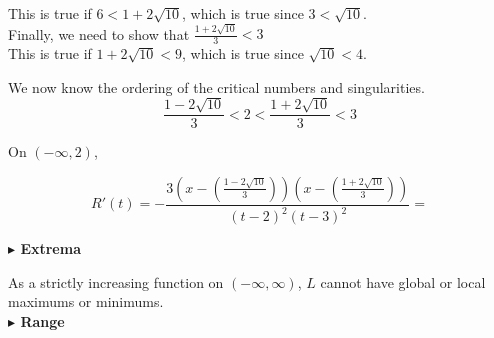 \documentclass{ximera}
\begin{document}
\begin{example}
\begin{explanation}
This is true if $6 < 1 + 2 \sqrt{10}$, which is true since $3 < \sqrt{10}$. \\



Finally, we need to show that $\frac{1 + 2 \sqrt{10}}{3} < 3$ \\


This is true if $1 + 2 \sqrt{10} < 9$, which is true since $\sqrt{10} < 4$.





\end{explanation}




We now know the ordering of the critical numbers and singularities. \\


\[
\frac{1 - 2 \sqrt{10}}{3} < 2 < \frac{1 + 2 \sqrt{10}}{3} < 3
\]





On $(-\infty, 2)$, 



\[   
R'(t) = -\frac{3 \left(x - \left(\frac{1 - 2 \sqrt{10}}{3} \right) \right) \left(x - \left(\frac{1 + 2 \sqrt{10}}{3} \right) \right) }{ (t-2)^2 (t-3)^2 }  = 
\]






































\textbf{\textcolor{blue!55!black}{$\blacktriangleright$ Extrema}} 


As a strictly increasing function on $(-\infty, \infty)$, $L$ cannot have global or local maximums or minimums. \\










\textbf{\textcolor{blue!55!black}{$\blacktriangleright$ Range}} 




\end{example}
\end{document}
